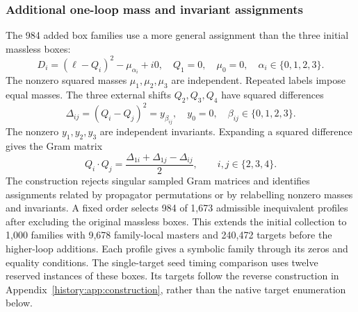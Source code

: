 \subsubsection{Additional one-loop mass and invariant assignments}
The 984 added box families use a more general assignment than the three initial massless boxes:
\begin{equation}
 D_i=(\ell-Q_i)^2-\mu_{\alpha_i}+i0,
 \quad Q_1=0,\quad \mu_0=0,\quad \alpha_i\in\{0,1,2,3\}.
\end{equation}
The nonzero squared masses $\mu_1,\mu_2,\mu_3$ are independent. Repeated labels impose equal masses. The three external shifts $Q_2,Q_3,Q_4$ have squared differences
\begin{equation}
 \Delta_{ij}=(Q_i-Q_j)^2=y_{\beta_{ij}},
 \quad y_0=0,\quad \beta_{ij}\in\{0,1,2,3\}.
\end{equation}
The nonzero $y_1,y_2,y_3$ are independent invariants. Expanding a squared difference gives the Gram matrix
\begin{equation}
 Q_i\cdot Q_j=\frac{\Delta_{1i}+\Delta_{1j}-\Delta_{ij}}2,
 \qquad i,j\in\{2,3,4\}.
\end{equation}
The construction rejects singular sampled Gram matrices and identifies assignments related by propagator permutations or by relabelling nonzero masses and invariants. A fixed order selects 984 of 1,673 admissible inequivalent profiles after excluding the original massless boxes. This extends the initial collection to 1,000 families with 9,678 family-local masters and 240,472 targets before the higher-loop additions. Each profile gives a symbolic family through its zeros and equality conditions. The single-target seed timing comparison uses twelve reserved instances of these boxes. Its targets follow the reverse construction in Appendix~\ref{history:app:construction}, rather than the native target enumeration below.


